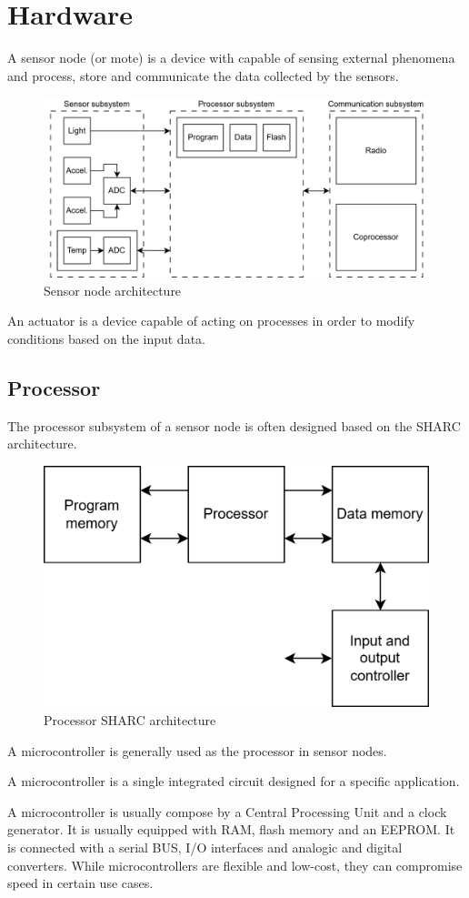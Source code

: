 \section{Hardware}

\begin{definition}
    A sensor node (or mote) is a device with capable of sensing external phenomena and process, store and communicate the data collected by the sensors.
\end{definition}

\begin{figure}[H]
    \centering
    \includegraphics[width=0.75\linewidth]{images/iot2.png}
    \caption{Sensor node architecture}
\end{figure}

\begin{definition}
    An actuator is a device capable of acting on processes in order to modify conditions based on the input data.
\end{definition}

\subsection{Processor}
The processor subsystem of a sensor node is often designed based on the SHARC architecture. 
\begin{figure}[H]
    \centering
    \includegraphics[width=0.5\linewidth]{images/iot3.png}
    \caption{Processor SHARC architecture}
\end{figure}

A microcontroller is generally used as the processor in sensor nodes.
\begin{definition}
    A microcontroller is a single integrated circuit designed for a specific application.
\end{definition}
\noindent A microcontroller is usually compose by a Central Processing Unit and a clock generator. 
It is usually equipped with RAM, flash memory and an EEPROM. 
It is connected with a serial BUS, I/O interfaces and analogic and digital converters. 
While microcontrollers are flexible and low-cost, they can compromise speed in certain use cases.


